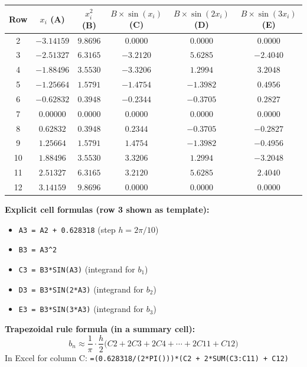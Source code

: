 \documentclass[12pt,a4paper]{article}
\begin{document}
\medskip
\begin{center}
\begin{tabular}{@{}cccccc@{}}
\toprule
\textbf{Row} & \textbf{$x_i$ (A)} & \textbf{$x_i^2$ (B)} &
\textbf{$B{\times}\sin(x_i)$ (C)} &
\textbf{$B{\times}\sin(2x_i)$ (D)} &
\textbf{$B{\times}\sin(3x_i)$ (E)} \\
\midrule
2  & $-3.14159$ & $9.8696$ &  $0.0000$ &  $0.0000$ &  $0.0000$ \\
3  & $-2.51327$ & $6.3165$ & $-3.2120$ & $5.6285$  & $-2.4040$ \\
4  & $-1.88496$ & $3.5530$ & $-3.3206$ & $1.2994$  &  $3.2048$ \\
5  & $-1.25664$ & $1.5791$ & $-1.4754$ & $-1.3982$ &  $0.4956$ \\
6  & $-0.62832$ & $0.3948$ & $-0.2344$ & $-0.3705$ & $0.2827$  \\
7  &  $0.00000$ & $0.0000$ &  $0.0000$ &  $0.0000$ &  $0.0000$ \\
8  &  $0.62832$ & $0.3948$ &  $0.2344$ &  $-0.3705$ & $-0.2827$ \\
9  &  $1.25664$ & $1.5791$ &  $1.4754$ & $-1.3982$ & $-0.4956$ \\
10 &  $1.88496$ & $3.5530$ &  $3.3206$ &  $1.2994$ & $-3.2048$ \\
11 &  $2.51327$ & $6.3165$ &  $3.2120$ &  $5.6285$ &  $2.4040$ \\
12 &  $3.14159$ & $9.8696$ &  $0.0000$ &  $0.0000$ &  $0.0000$ \\
\bottomrule
\end{tabular}
\end{center}

\medskip
\textbf{Explicit cell formulas (row 3 shown as template):}
\begin{itemize}[nosep]
  \item \texttt{A3 = A2 + 0.628318} \quad (step $h = 2\pi/10$)
  \item \texttt{B3 = A3\^{}2}
  \item \texttt{C3 = B3*SIN(A3)} \quad (integrand for $b_1$)
  \item \texttt{D3 = B3*SIN(2*A3)} \quad (integrand for $b_2$)
  \item \texttt{E3 = B3*SIN(3*A3)} \quad (integrand for $b_3$)
\end{itemize}

\textbf{Trapezoidal rule formula (in a summary cell):}
\[
  b_n \approx \frac{1}{\pi}\cdot\frac{h}{2}\bigl(C2 + 2C3 + 2C4 + \cdots + 2C11 + C12\bigr)
\]
In Excel for column C: \texttt{=(0.628318/(2*PI()))*(C2 + 2*SUM(C3:C11) + C12)}
\end{document}
